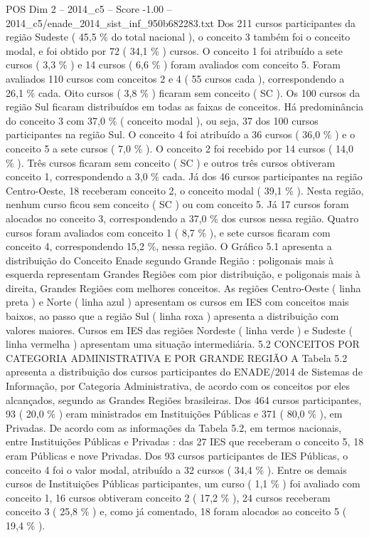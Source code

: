 \begin{textsample}{POS Dim 2 – 2014\_c5 – Score -1.00 – 2014\_c5/enade\_2014\_sist\_inf\_950b682283.txt}
Dos 211 cursos participantes da região Sudeste ( 45,5 \% do total nacional ), o conceito 3 também foi o conceito modal, e foi obtido por 72 ( 34,1 \% ) cursos.
O conceito 1 foi atribuído a sete cursos ( 3,3 \% ) e 14 cursos ( 6,6 \% ) foram avaliados com conceito 5.
Foram avaliados 110 cursos com conceitos 2 e 4 ( 55 cursos cada ), correspondendo a 26,1 \% cada.
Oito cursos ( 3,8 \% ) ficaram sem conceito ( SC ).
Os 100 cursos da região Sul ficaram distribuídos em todas as faixas de conceitos.
Há predominância do conceito 3 com 37,0 \% ( conceito modal ), ou seja, 37 dos 100 cursos participantes na região Sul.
O conceito 4 foi atribuído a 36 cursos ( 36,0 \% ) e o conceito 5 a sete cursos ( 7,0 \% ).
O conceito 2 foi recebido por 14 cursos ( 14,0 \% ).
Três cursos ficaram sem conceito ( SC ) e outros três cursos obtiveram conceito 1, correspondendo a 3,0 \% cada.
Já dos 46 cursos participantes na região Centro-Oeste, 18 receberam conceito 2, o conceito modal ( 39,1 \% ).
Nesta região, nenhum curso ficou sem conceito ( SC ) ou com conceito 5.
Já 17 cursos foram alocados no conceito 3, correspondendo a 37,0 \% dos cursos nessa região.
Quatro cursos foram avaliados com conceito 1 ( 8,7 \% ), e sete cursos ficaram com conceito 4, correspondendo 15,2 \%, nessa região.
O Gráfico 5.1 apresenta a distribuição do Conceito Enade segundo Grande Região : poligonais mais à esquerda representam Grandes Regiões com pior distribuição, e poligonais mais à direita, Grandes Regiões com melhores conceitos.
As regiões Centro-Oeste ( linha preta ) e Norte ( linha azul ) apresentam os cursos em IES com conceitos mais baixos, ao passo que a região Sul ( linha roxa ) apresenta a distribuição com valores maiores.
Cursos em IES das regiões Nordeste ( linha verde ) e Sudeste ( linha vermelha ) apresentam uma situação intermediária. 5.2 CONCEITOS POR CATEGORIA ADMINISTRATIVA E POR GRANDE REGIÃO A Tabela 5.2 apresenta a distribuição dos cursos participantes do ENADE/2014 de Sistemas de Informação, por Categoria Administrativa, de acordo com os conceitos por eles alcançados, segundo as Grandes Regiões brasileiras.
Dos 464 cursos participantes, 93 ( 20,0 \% ) eram ministrados em Instituições Públicas e 371 ( 80,0 \% ), em Privadas.
De acordo com as informações da Tabela 5.2, em termos nacionais, entre Instituições Públicas e Privadas : das 27 IES que receberam o conceito 5, 18 eram Públicas e nove Privadas.
Dos 93 cursos participantes de IES Públicas, o conceito 4 foi o valor modal, atribuído a 32 cursos ( 34,4 \% ).
Entre os demais cursos de Instituições Públicas participantes, um curso ( 1,1 \% ) foi avaliado com conceito 1, 16 cursos obtiveram conceito 2 ( 17,2 \% ), 24 cursos receberam conceito 3 ( 25,8 \% ) e, como já comentado, 18 foram alocados ao conceito 5 ( 19,4 \% ).

\end{textsample}
